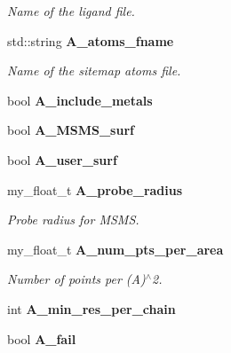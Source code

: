 \begin{CompactItemize}
\begin{CompactList}\small\item\em Name of the ligand file. \item\end{CompactList}\item 
std::string \bf{A\_\-atoms\_\-fname}\label{classASCbase_1_1Sitemap_22af7b3e2f83f482711f96fd2b8036fb}

\begin{CompactList}\small\item\em Name of the sitemap atoms file. \item\end{CompactList}\item 
bool \textbf{A\_\-include\_\-metals}\label{classASCbase_1_1Sitemap_085592f9e6ab4a46b1717d17e15f3590}

\item 
bool \textbf{A\_\-MSMS\_\-surf}\label{classASCbase_1_1Sitemap_cc87543764821d5965c02426e3b621c0}

\item 
bool \textbf{A\_\-user\_\-surf}\label{classASCbase_1_1Sitemap_8a9754cb39062045c87758860244e132}

\item 
my\_\-float\_\-t \bf{A\_\-probe\_\-radius}\label{classASCbase_1_1Sitemap_7474a2670e5f74e20594a2add689f8d5}

\begin{CompactList}\small\item\em Probe radius for MSMS. \item\end{CompactList}\item 
my\_\-float\_\-t \bf{A\_\-num\_\-pts\_\-per\_\-area}\label{classASCbase_1_1Sitemap_f9dbc37200a6d1841ea366760f8d0837}

\begin{CompactList}\small\item\em Number of points per (A)$^\wedge$2. \item\end{CompactList}\item 
int \textbf{A\_\-min\_\-res\_\-per\_\-chain}\label{classASCbase_1_1Sitemap_ca99b08072b44f7f26cd714417333b44}

\item 
bool \textbf{A\_\-fail}\label{classASCbase_1_1Sitemap_960c9c48a78c77be9eae68071e34e987}

\end{CompactItemize}
